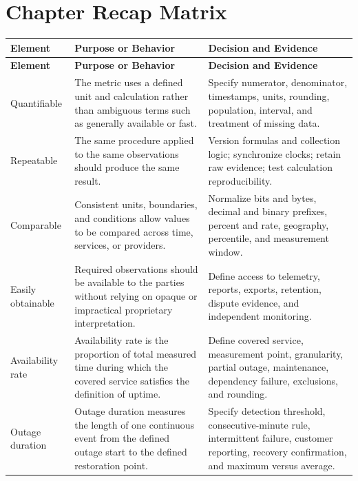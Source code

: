 \documentclass[11pt]{article}
\begin{document}
\section{Chapter Recap Matrix}
\begingroup\small\setlength{\tabcolsep}{4pt}
\begin{longtable}{@{}>{\RaggedRight\arraybackslash}p{}>{\RaggedRight\arraybackslash}p{}>{\RaggedRight\arraybackslash}p{}@{}}
\toprule\rowcolor{Navy}\color{white}\textbf{Element} & \color{white}\textbf{Purpose or Behavior} & \color{white}\textbf{Decision and Evidence}\\\midrule\endfirsthead
\toprule\rowcolor{Navy}\color{white}\textbf{Element} & \color{white}\textbf{Purpose or Behavior} & \color{white}\textbf{Decision and Evidence}\\\midrule\endhead
Quantifiable & The metric uses a defined unit and calculation rather than ambiguous terms such as generally available or fast. & Specify numerator, denominator, timestamps, units, rounding, population, interval, and treatment of missing data. \\\midrule
Repeatable & The same procedure applied to the same observations should produce the same result. & Version formulas and collection logic; synchronize clocks; retain raw evidence; test calculation reproducibility. \\\midrule
Comparable & Consistent units, boundaries, and conditions allow values to be compared across time, services, or providers. & Normalize bits and bytes, decimal and binary prefixes, percent and rate, geography, percentile, and measurement window. \\\midrule
Easily obtainable & Required observations should be available to the parties without relying on opaque or impractical proprietary interpretation. & Define access to telemetry, reports, exports, retention, dispute evidence, and independent monitoring. \\\midrule
Availability rate & Availability rate is the proportion of total measured time during which the covered service satisfies the definition of uptime. & Define covered service, measurement point, granularity, partial outage, maintenance, dependency failure, exclusions, and rounding. \\\midrule
Outage duration & Outage duration measures the length of one continuous event from the defined outage start to the defined restoration point. & Specify detection threshold, consecutive-minute rule, intermittent failure, customer reporting, recovery confirmation, and maximum versus average. \\\midrule

\end{longtable}
\end{document}
